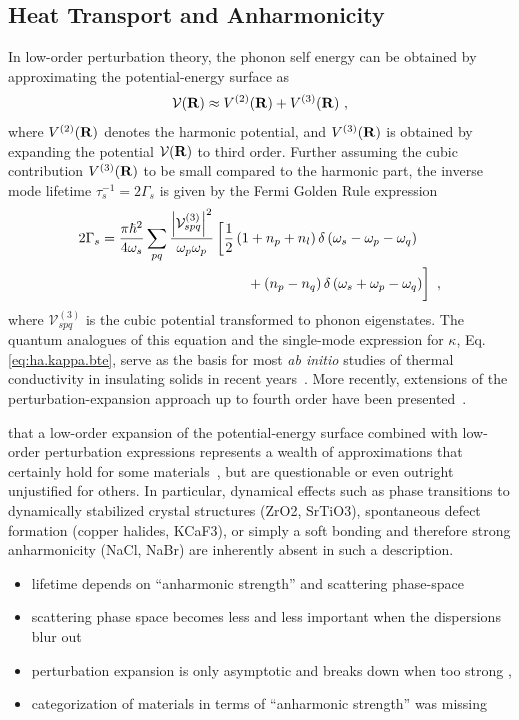 \subsection{Heat Transport and Anharmonicity}
In low-order perturbation theory, the phonon self energy can be obtained by approximating the potential-energy surface as
\begin{align}
	\mathcal{V} (\b R) \approx V^{(2)} (\b R) + V^{(3)} (\b R)~,
	\label{eq:V3}
\end{align}
where $V^{(2)} ({\bf R})$ denotes the harmonic potential, and $V^{(3)} ({\bf R})$ is obtained by expanding the potential $\mathcal V ({\bf R})$ to third order. Further assuming the cubic contribution $V^{(3)} ({\bf R})$ to be small compared to the harmonic part, the inverse mode lifetime $\tau_s^{-1} = 2 \Gamma_s$ is given by the Fermi Golden Rule expression~\cite{Fabian1996}
\begin{align}
\begin{split}
	2 \Gamma_{s}=\frac{\pi \hbar^{2}}{4 \omega_{s}} \sum_{pq} \frac{\left|\mathcal V^{(3)}_{spq}\right|^{2}}{\omega_{p} \omega_{p}}
		&\left[ 
	  \frac{1}{2}\left(1+n_{p}+n_{l}\right) \delta\left(\omega_{s}-\omega_{p}-\omega_{q}\right) \right. \\
		&\left.~~~~ \phantom{\halb} + \left(n_{p}-n_{q}\right) \delta\left(\omega_{s}+\omega_{p}-\omega_{q}\right)\right]~,
\end{split}
\end{align}
where $\mathcal V^{(3)}_{spq}$ is the cubic potential transformed to phonon eigenstates. The quantum analogues of this equation and the single-mode expression for $\kappa$, Eq.\,\eqref{eq:ha.kappa.bte}, serve as the basis for most \emph{ab initio} studies of thermal conductivity in insulating solids in recent years~. More recently, extensions of the perturbation-expansion approach up to fourth order have been presented~.

 that a low-order expansion of the potential-energy surface combined with low-order perturbation expressions represents a wealth of approximations that certainly hold for some materials~, but are questionable or even outright unjustified for others. In particular, dynamical effects such as phase transitions to dynamically stabilized crystal structures (ZrO2, SrTiO3), spontaneous defect formation (copper halides, KCaF3), or simply a soft bonding and therefore strong anharmonicity (NaCl, NaBr) are inherently absent in such a description.

\begin{itemize}
	\item lifetime depends on ``anharmonic strength'' and scattering phase-space
	\item scattering phase space becomes less and less important when the dispersions blur out
	\item perturbation expansion is only asymptotic and breaks down when too strong ,
	\item categorization of materials in terms of ``anharmonic strength'' was missing
\end{itemize}
